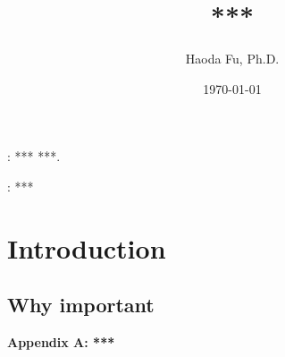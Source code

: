 \documentclass[12pt]{article}
\renewcommand{\theequation} {\arabic{section}.\arabic{equation}}
\begin{document}
\title
{\bf ****}
\author
{
Haoda Fu, Ph.D. \\
}
\date{\today}
\maketitle
\begin{abstract}

\end{abstract}

: *** ***.

: ***
\section{Introduction}





	

\subsection{Why important}

\setcounter{equation}{0}
\renewcommand{\theequation} {A.\arabic{equation}}
\begin{center}
\bf \Large Appendix A: ***
\end{center}






\end{document}
